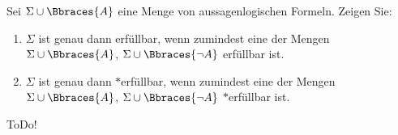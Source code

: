 
\begin{exercise}[25]

Sei $\Sigma \cup \Bbraces{A}$ eine Menge von aussagenlogischen Formeln.
Zeigen Sie:

\begin{enumerate}
    \item $\Sigma$ ist genau dann erfüllbar, wenn zumindest eine der Mengen $\Sigma \cup \Bbraces{A}$, $\Sigma \cup \Bbraces{\neg A}$ erfüllbar ist.
    \item $\Sigma$ ist genau dann $\ast$erfüllbar, wenn zumindest eine der Mengen $\Sigma \cup \Bbraces{A}$, $\Sigma \cup \Bbraces{\neg A}$ $\ast$erfüllbar ist.
\end{enumerate}

\end{exercise}


\begin{solution}

ToDo!

\end{solution}


